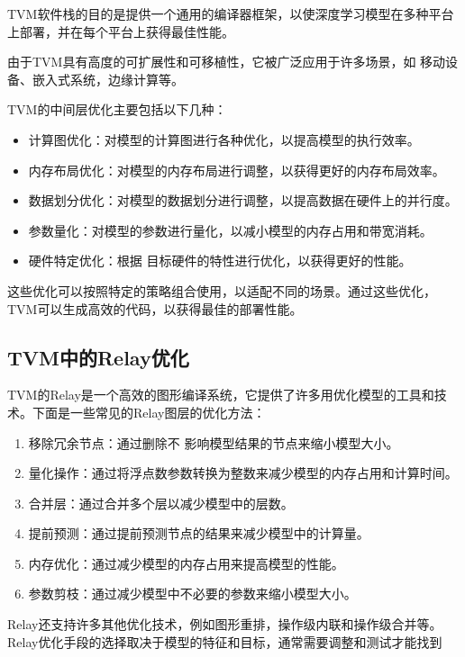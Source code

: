 TVM软件栈的目的是提供一个通用的编译器框架，以使深度学习模型在多种平台上部署，并在每个平台上获得最佳性能。

由于TVM具有高度的可扩展性和可移植性，它被广泛应用于许多场景，如 移动设备、嵌入式系统，边缘计算等。

TVM的中间层优化主要包括以下几种：

\begin{itemize}
	\item 计算图优化：对模型的计算图进行各种优化，以提高模型的执行效率。
	\item 内存布局优化：对模型的内存布局进行调整，以获得更好的内存布局效率。
	\item 数据划分优化：对模型的数据划分进行调整，以提高数据在硬件上的并行度。
    \item 参数量化：对模型的参数进行量化，以减小模型的内存占用和带宽消耗。
    \item 硬件特定优化：根据 目标硬件的特性进行优化，以获得更好的性能。
\end{itemize}

这些优化可以按照特定的策略组合使用，以适配不同的场景。通过这些优化，TVM可以生成高效的代码，以获得最佳的部署性能。

\subsection{TVM中的Relay优化}

TVM的Relay是一个高效的图形编译系统，它提供了许多用优化模型的工具和技术。下面是一些常见的Relay图层的优化方法：

\begin{enumerate}
	\item 移除冗余节点：通过删除不 影响模型结果的节点来缩小模型大小。
	\item 量化操作：通过将浮点数参数转换为整数来减少模型的内存占用和计算时间。
	\item 合并层：通过合并多个层以减少模型中的层数。
    \item 提前预测：通过提前预测节点的结果来减少模型中的计算量。
    \item 内存优化：通过减少模型的内存占用来提高模型的性能。
    \item 参数剪枝：通过减少模型中不必要的参数来缩小模型大小。
\end{enumerate}

Relay还支持许多其他优化技术，例如图形重排，操作级内联和操作级合并等。Relay优化手段的选择取决于模型的特征和目标，通常需要调整和测试才能找到